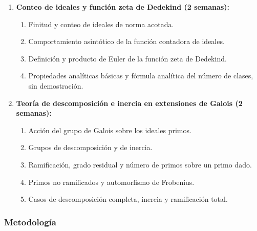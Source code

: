 \begin{refsection}
\begin{enumerate}
\item \textbf{Conteo de ideales y función zeta de Dedekind (2 semanas):}
\begin{enumerate}
\item Finitud y conteo de ideales de norma acotada.
\item Comportamiento asintótico de la función contadora de ideales.
\item Definición y producto de Euler de la función zeta de Dedekind.
\item Propiedades analíticas básicas y fórmula analítica del número de clases, sin demostración.
\end{enumerate}

\item \textbf{Teoría de descomposición e inercia en extensiones de Galois (2 semanas):}
\begin{enumerate}
\item Acción del grupo de Galois sobre los ideales primos.
\item Grupos de descomposición y de inercia.
\item Ramificación, grado residual y número de primos sobre un primo dado.
\item Primos no ramificados y automorfismo de Frobenius.
\item Casos de descomposición completa, inercia y ramificación total.
\end{enumerate}



\end{enumerate}



\subsubsection*{Metodología}


\end{refsection}
